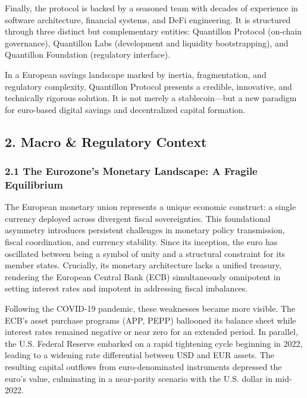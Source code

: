 Finally, the protocol is backed by a seasoned team with decades of
experience in software architecture, financial systems, and DeFi
engineering. It is structured through three distinct but complementary
entities: Quantillon Protocol (on-chain governance), Quantillon Labs
(development and liquidity bootstrapping), and Quantillon Foundation
(regulatory interface).

In a European savings landscape marked by inertia, fragmentation, and
regulatory complexity, Quantillon Protocol presents a credible,
innovative, and technically rigorous solution. It is not merely a
stablecoin---but a new paradigm for euro-based digital savings and
decentralized capital formation.

\hypertarget{macro-regulatory-context}{%
\subsection{2. Macro \& Regulatory
Context}\label{macro-regulatory-context}}

\hypertarget{the-eurozones-monetary-landscape-a-fragile-equilibrium}{%
\subsubsection{2.1 The Eurozone's Monetary Landscape: A Fragile
Equilibrium}\label{the-eurozones-monetary-landscape-a-fragile-equilibrium}}

The European monetary union represents a unique economic construct: a
single currency deployed across divergent fiscal sovereignties. This
foundational asymmetry introduces persistent challenges in monetary
policy transmission, fiscal coordination, and currency stability. Since
its inception, the euro has oscillated between being a symbol of unity
and a structural constraint for its member states. Crucially, its
monetary architecture lacks a unified treasury, rendering the European
Central Bank (ECB) simultaneously omnipotent in setting interest rates
and impotent in addressing fiscal imbalances.

Following the COVID-19 pandemic, these weaknesses became more visible.
The ECB's asset purchase programs (APP, PEPP) ballooned its balance
sheet while interest rates remained negative or near zero for an
extended period. In parallel, the U.S. Federal Reserve embarked on a
rapid tightening cycle beginning in 2022, leading to a widening rate
differential between USD and EUR assets. The resulting capital outflows
from euro-denominated instruments depressed the euro's value,
culminating in a near-parity scenario with the U.S. dollar in mid-2022.


